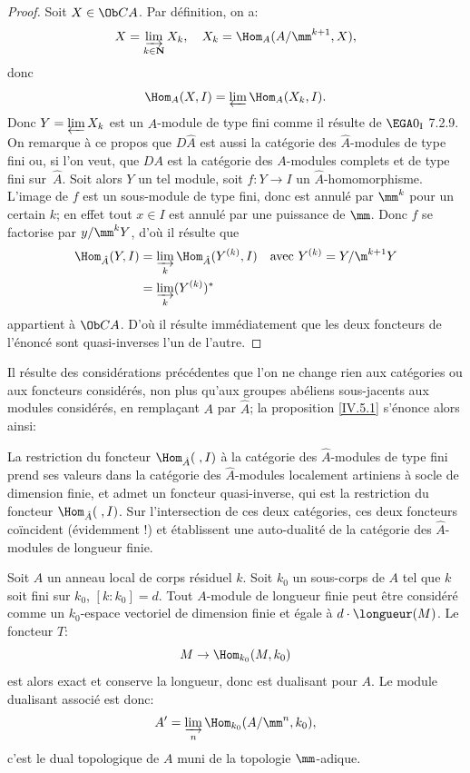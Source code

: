 \begin{proof}
Soit $X\in \Ob CA$. Par d\'efinition, on a:
$$
X=\varinjlim_{k\in {\bf N}}X_{k}, \quad X_{k}=\Hom_{A}(A/\mm^{k+1}, X),
$$
donc
$$
\Hom_{A}(X, I)=\varprojlim \Hom_{A}(X_{k}, I).
$$
Donc $Y=\varprojlim X_{k}$ est un $\hat{A}$-module de type fini comme il r\'esulte de $\EGA 0_{\textup{I}}$ 7.2.9. On remarque \`a ce propos que $D\hat{A}$ est aussi la cat\'egorie des $\hat{A}$-modules de type fini ou, si l'on veut, que $DA$ est la cat\'egorie des $A$-modules complets et de type fini sur~$\hat{A}$. Soit alors $Y$ un tel module, soit $f:Y\to I$ un $\hat{A}$-homomorphisme. L'image de $f$ est un sous-module de type fini, donc est annul\'e par $\mm^{k}$ pour un certain $k$; en effet tout $x\in I$ est annul\'e par une puissance de $\mm$. Donc $f$ se factorise par $y/\mm^{k}Y$, d'o\`u il r\'esulte que
\begin{align*}
\Hom_{\hat{A}}(Y, I)&=\varinjlim_k\Hom_{\hat{A}}(Y^{(k)}, I)\quad\text{avec } Y^{(k)}=Y/\m^{k+1}Y\\
&=\varinjlim_k(Y^{(k)})^*
\end{align*}
appartient \`a $\Ob CA$. D'o\`u il r\'esulte imm\'ediatement que les deux foncteurs de l'\'enonc\'e sont quasi-inverses l'un de l'autre.
\skipqed
\end{proof}

Il r\'esulte des consid\'erations pr\'ec\'edentes que l'on ne change rien
aux cat\'egories ou aux foncteurs consid\'er\'es, non plus qu'aux
groupes ab\'eliens sous-jacents aux modules consid\'er\'es, en rempla\c
cant $A$ par $\hat{A}$; la proposition \ref{IV.5.1} s'\'enonce alors ainsi:

La restriction du foncteur $\Hom_{\hat{A}}(\;, I)$ \`a la cat\'egorie des $\hat{A}$-modules de type fini prend ses valeurs dans la cat\'egorie des $\hat{A}$-modules localement artiniens \`a socle de dimension finie, et admet un foncteur quasi-inverse, qui est la restriction du foncteur $\Hom_{\hat{A}}(\;, I)$. Sur l'intersection de ces deux cat\'egories, ces deux foncteurs co\"incident (\'evidemment !) et \'etablissent une auto-dualit\'e de la cat\'egorie des $\hat{A}$-modules de longueur finie.

\begin{exemple}[MACAULAY]
\label{IV.5.2} Soit $A$ un anneau local de corps r\'esiduel $k$. Soit $k_{0}$ un sous-corps de $A$ tel que $k$ soit fini sur $k_{0}$, $[k:k_{0}]=d$. Tout $A$-module de longueur finie peut \^etre consid\'er\'e comme un $k_{0}$-espace vectoriel de dimension finie et \'egale \`a $d\cdot\longueur(M)$. Le foncteur $T$:
$$
M\to \Hom_{k_{0}}(M, k_{0})
$$
est alors exact et conserve la longueur, donc est dualisant pour $A$. Le module dualisant associ\'e est donc:
$$
A'=\varinjlim_{n}\Hom_{k_{0}}(A/\mm^{n}, k_{0}),
$$
c'est le dual topologique de $A$ muni de la topologie $\mm$-adique.
\end{exemple}

